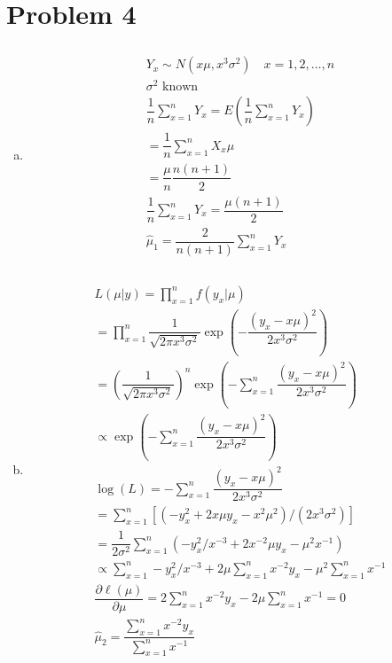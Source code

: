 \documentclass{article}
\newcommand{\dll}[1]{\dfrac{\partial \ell({#1})}{\partial{#1}}}
\begin{document}
\begin{flushleft}
\begin{enumerate}[(a)]
\end{enumerate}

	\section*{Problem 4}
	
\begin{enumerate}[(a)]
	
	\item 	
\begin{multline*}\\
Y_x\sim N(x\mu,x^3\sigma^2) \quad x=1,2,\dots,n\\
\sigma^2 \text{ known}\\
\dfrac{1}{n}\sum_{x=1}^{n}Y_x=E\left(\dfrac{1}{n} \sum_{x=1}^{n}Y_x\right)\\
=\dfrac{1}{n}\sum_{x=1}^{n}X_x\mu\\
=\dfrac{\mu}{n}\dfrac{n(n+1)}{2}\\
\dfrac{1}{n}\sum_{x=1}^{n}Y_x=\dfrac{\mu(n+1)}{2}\\
\hat{\mu}_{1}=\dfrac{2}{n(n+1)}\sum_{x=1}^{n}Y_x\\
\end{multline*}
\pagebreak
	\item 
\begin{multline*}\\
L(\mu|y)=\prod_{x=1}^{n}f(y_x|\mu)\\
=\prod_{x=1}^{n}\dfrac{1}{\sqrt{2\pi x^3 \sigma^2}}\exp\left(-\dfrac{(y_x-x\mu)^2}{2x^3\sigma^2}\right)\\
=\left(\dfrac{1}{\sqrt{2\pi x^3 \sigma^2}}\right)^n \exp\left(-\sum_{x=1}^{n}\dfrac{(y_x-x\mu)^2}{2x^3\sigma^2}\right)\\
\propto \exp\left(-\sum_{x=1}^{n}\dfrac{(y_x-x\mu)^2}{2x^3\sigma^2}\right)\\
\log(L)=-\sum_{x=1}^{n}\dfrac{(y_x-x\mu)^2}{2x^3\sigma^2}\\
=\sum_{x=1}^{n}[(-y_x^2+2x\mu y_x-x^2\mu^2)/(2x^3\sigma^2)]\\
=\dfrac{1}{2\sigma^2}\sum_{x=1}^{n}(-y_x^2/x^{-3}+2x^{-2}\mu y_x-\mu^2x^{-1})\\
\propto \sum_{x=1}^{n}-y^2_x/x^{-3}+2\mu\sum_{x=1}^{n}x^{-2}y_x-\mu^2\sum_{x=1}^{n}x^{-1}\\
\dll{\mu}=2\sum_{x=1}^{n}x^{-2}y_x-2\mu\sum_{x=1}^{n}x^{-1}=0\\
\hat{\mu}_{2}=\dfrac{\sum_{x=1}^{n}x^{-2}y_x}{\sum_{x=1}^{n}x^{-1}}\\
\end{multline*}


\end{enumerate}
\end{flushleft}
\end{document}
